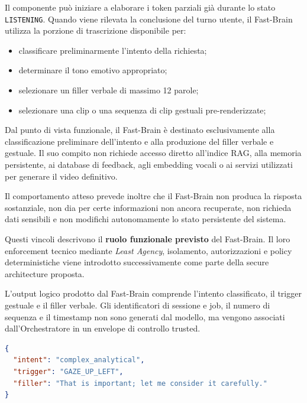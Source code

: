 \documentclass[11pt,a4paper]{article}
\begin{document}
Il componente può iniziare a elaborare i token parziali già durante lo
stato \texttt{LISTENING}. Quando viene rilevata la conclusione del turno
utente, il Fast-Brain utilizza la porzione di trascrizione disponibile
per:

\begin{itemize}

    \item classificare preliminarmente l'intento della richiesta;
    \item determinare il tono emotivo appropriato;
    \item selezionare un filler verbale di massimo 12 parole;
    \item selezionare una clip o una sequenza di clip gestuali
    pre-renderizzate;

\end{itemize}

Dal punto di vista funzionale, il Fast-Brain è destinato esclusivamente
alla classificazione preliminare dell'intento e alla produzione del
filler verbale e gestuale. Il suo compito non richiede accesso diretto
all'indice RAG, alla memoria persistente, ai database di feedback,
agli embedding vocali o ai servizi utilizzati per generare il video
definitivo.

Il comportamento atteso prevede inoltre che il Fast-Brain non produca
la risposta sostanziale, non dia per certe informazioni non ancora
recuperate, non richieda dati sensibili e non modifichi autonomamente
lo stato persistente del sistema.

Questi vincoli descrivono il \textbf{ruolo funzionale previsto} del
Fast-Brain. Il loro enforcement tecnico mediante \emph{Least Agency},
isolamento, autorizzazioni e policy deterministiche viene introdotto
successivamente come parte della secure architecture proposta.

L'output logico prodotto dal Fast-Brain comprende l'intento
classificato, il trigger gestuale e il filler verbale. Gli identificatori
di sessione e job, il numero di sequenza e il timestamp non sono
generati dal modello, ma vengono associati dall'Orchestratore in un
envelope di controllo trusted.

\begin{lstlisting}[language=json,
caption={Esempio di output logico del Fast-Brain.}]
{
  "intent": "complex_analytical",
  "trigger": "GAZE_UP_LEFT",
  "filler": "That is important; let me consider it carefully."
}
\end{lstlisting}
\end{document}

